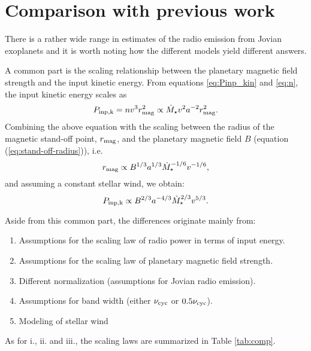 \documentclass[iop,numberedappendix,apj]{emulateapj}
\begin{document}
\section{Comparison with previous work}
\label{sec:AppendixB}

There is a rather wide range in estimates of the radio emission from Jovian exoplanets and it is worth noting how the different models yield different answers. 

A common part is the scaling relationship between the planetary magnetic field strength and the input kinetic energy.
From equations \ref{eq:Pinp_kin} and \ref{eq:n}, the input kinetic energy scales as
\begin{equation}
P_{\rm inp,k}=nv^3 r_{\rm mag}^2 \propto \dot M_{\star} v^2 a^{-2} r_{\rm mag}^2.
\end{equation}
Combining the above equation with the scaling between the radius of the magnetic stand-off point, $r_{\rm mag}$, and the planetary magnetic field $B$ (equation (\ref{eq:stand-off-radius})), i.e.\
\begin{equation}
r_{\rm mag} \propto B^{1/3} a^{1/3} \dot M_{\star }^{-1/6} v^{-1/6}, 
\end{equation}
and assuming a constant stellar wind, we obtain:
\begin{equation}
P_{\rm inp, k} \propto B^{2/3} a^{-4/3} \dot M_{\star }^{2/3} v^{5/3}.
\end{equation}

Aside from this common part, the differences originate mainly from:
\renewcommand{\theenumi}{\roman{enumi}}
\begin{enumerate}
\item Assumptions for the scaling law of radio power in terms of input energy. 
\item Assumptions for the scaling law of planetary magnetic field strength. 
\item Different normalization (assumptions for Jovian radio emission). 
\item Assumptions for band width (either $\nu_{\rm cyc}$ or $0.5\nu_{\rm cyc}$). 
\item Modeling of stellar wind
\end{enumerate}

As for i., ii. and iii., the scaling laws are summarized in Table \ref{tab:comp}. 
\end{document}
